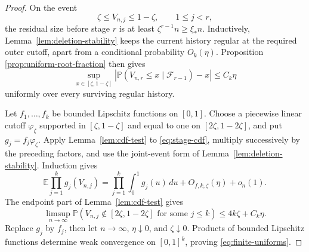 \documentclass[11pt]{article}
\theoremstyle{definition}
\theoremstyle{remark}
\newcommand{\Pp}{\mathbb P}
\newcommand{\Ee}{\mathbb E}
\newcommand{\dd}{\,d}
\begin{document}
\begin{proof}
On the event
\begin{equation}
 \zeta\le V_{n,j}\le1-\zeta,
 \qquad 1\le j<r,
 \label{eq:interior-history}
\end{equation}
the residual size before stage $r$ is at least
$\zeta^{r-1}n\ge\xi_*n$.  Inductively, Lemma~\ref{lem:deletion-stability}
keeps the current history regular at the required outer cutoff, apart from a
conditional probability $O_k(\eta)$.  Proposition
\ref{prop:uniform-root-fraction} then gives
\begin{equation}
 \sup_{x\in[\zeta,1-\zeta]}
 \left|\Pp(V_{n,r}\le x\mid\mathscr F_{r-1})-x\right|
 \le C_k\eta
 \label{eq:stage-cdf}
\end{equation}
uniformly over every surviving regular history.

Let $f_1,\ldots,f_k$ be bounded Lipschitz functions on $[0,1]$.  Choose a
piecewise linear cutoff $\varphi_\zeta$ supported in
$[\zeta,1-\zeta]$ and equal to one on
$[2\zeta,1-2\zeta]$, and put $g_j=f_j\varphi_\zeta$.  Apply
Lemma~\ref{lem:cdf-test} to \eqref{eq:stage-cdf}, multiply successively by the
preceding factors, and use the joint-event form of
Lemma~\ref{lem:deletion-stability}.  Induction gives
\[
 \Ee\prod_{j=1}^kg_j(V_{n,j})
 =\prod_{j=1}^k\int_0^1g_j(u)\dd u+O_{f,k,\zeta}(\eta)+o_n(1).
\]
The endpoint part of Lemma~\ref{lem:cdf-test} gives
\[
 \limsup_{n\to\infty}\Pp\left(
 V_{n,j}\notin[2\zeta,1-2\zeta]
 \text{ for some }j\le k\right)
 \le4k\zeta+C_k\eta.
\]
Replace $g_j$ by $f_j$, then let $n\to\infty$, $\eta\downarrow0$, and
$\zeta\downarrow0$.  Products of bounded Lipschitz functions determine weak
convergence on $[0,1]^k$, proving \eqref{eq:finite-uniforms}.
\end{proof}
\end{document}
